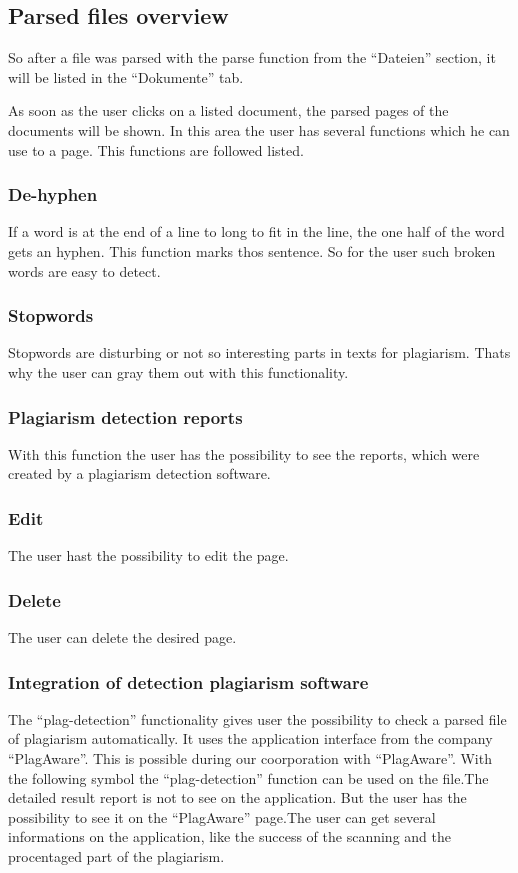 \subsection{Parsed files overview}\label{sec:parse-file}

So after a file was parsed with the parse function from the \enquote{Dateien} section, it will be listed in the 
\enquote{Dokumente} tab.

As soon as the user clicks on a listed document, the parsed pages of the documents will be shown. In this area the user has several functions which he can use to a page. This functions are followed listed.

\subsubsection{De-hyphen}
If a word is at the end of a line to long to fit in the line, the one half of the word gets an hyphen. This function marks thos sentence. So for the user such broken words are easy to detect.

\subsubsection{Stopwords}
Stopwords are disturbing or not so interesting parts in texts for plagiarism. Thats why the user can gray them out with this functionality.

\subsubsection{Plagiarism detection reports}
With this function the user has the possibility to see the reports, which were created by a plagiarism detection software.

\subsubsection{Edit}
The user hast the possibility to edit the page.
\subsubsection{Delete}
The user can delete the desired page.
\subsubsection{Integration of detection plagiarism software}

The \enquote{plag-detection} functionality gives user the possibility to check a parsed file of plagiarism automatically. 
It uses the application interface from the company \enquote{PlagAware}. This is possible during our coorporation with 
\enquote{PlagAware}.
With the following symbol the \enquote{plag-detection} function can be used on the file.The detailed result report is 
not to see on the application. But the user has the possibility to see it on the \enquote{PlagAware} page.The user can get 
several informations on the application, like the success of the scanning and the procentaged part of the plagiarism.

